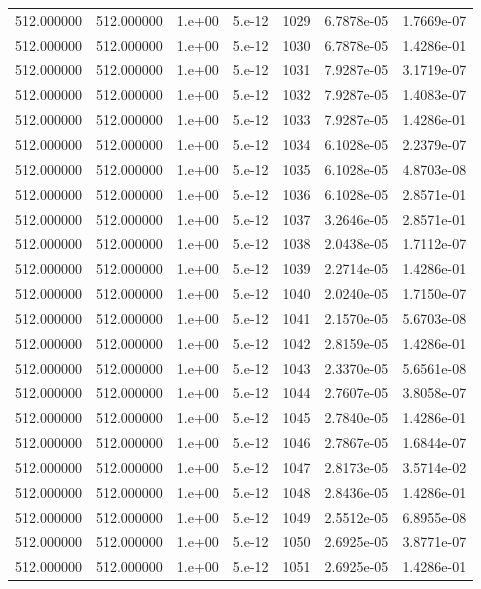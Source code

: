\begin{table}[htbp]
\begin{tabular}{rrrrrrr}
512.000000 & 512.000000 & 1.e+00 & 5.e-12 & 1029 & 6.7878e-05 & 1.7669e-07 \\
512.000000 & 512.000000 & 1.e+00 & 5.e-12 & 1030 & 6.7878e-05 & 1.4286e-01 \\
512.000000 & 512.000000 & 1.e+00 & 5.e-12 & 1031 & 7.9287e-05 & 3.1719e-07 \\
512.000000 & 512.000000 & 1.e+00 & 5.e-12 & 1032 & 7.9287e-05 & 1.4083e-07 \\
512.000000 & 512.000000 & 1.e+00 & 5.e-12 & 1033 & 7.9287e-05 & 1.4286e-01 \\
512.000000 & 512.000000 & 1.e+00 & 5.e-12 & 1034 & 6.1028e-05 & 2.2379e-07 \\
512.000000 & 512.000000 & 1.e+00 & 5.e-12 & 1035 & 6.1028e-05 & 4.8703e-08 \\
512.000000 & 512.000000 & 1.e+00 & 5.e-12 & 1036 & 6.1028e-05 & 2.8571e-01 \\
512.000000 & 512.000000 & 1.e+00 & 5.e-12 & 1037 & 3.2646e-05 & 2.8571e-01 \\
512.000000 & 512.000000 & 1.e+00 & 5.e-12 & 1038 & 2.0438e-05 & 1.7112e-07 \\
512.000000 & 512.000000 & 1.e+00 & 5.e-12 & 1039 & 2.2714e-05 & 1.4286e-01 \\
512.000000 & 512.000000 & 1.e+00 & 5.e-12 & 1040 & 2.0240e-05 & 1.7150e-07 \\
512.000000 & 512.000000 & 1.e+00 & 5.e-12 & 1041 & 2.1570e-05 & 5.6703e-08 \\
512.000000 & 512.000000 & 1.e+00 & 5.e-12 & 1042 & 2.8159e-05 & 1.4286e-01 \\
512.000000 & 512.000000 & 1.e+00 & 5.e-12 & 1043 & 2.3370e-05 & 5.6561e-08 \\
512.000000 & 512.000000 & 1.e+00 & 5.e-12 & 1044 & 2.7607e-05 & 3.8058e-07 \\
512.000000 & 512.000000 & 1.e+00 & 5.e-12 & 1045 & 2.7840e-05 & 1.4286e-01 \\
512.000000 & 512.000000 & 1.e+00 & 5.e-12 & 1046 & 2.7867e-05 & 1.6844e-07 \\
512.000000 & 512.000000 & 1.e+00 & 5.e-12 & 1047 & 2.8173e-05 & 3.5714e-02 \\
512.000000 & 512.000000 & 1.e+00 & 5.e-12 & 1048 & 2.8436e-05 & 1.4286e-01 \\
512.000000 & 512.000000 & 1.e+00 & 5.e-12 & 1049 & 2.5512e-05 & 6.8955e-08 \\
512.000000 & 512.000000 & 1.e+00 & 5.e-12 & 1050 & 2.6925e-05 & 3.8771e-07 \\
512.000000 & 512.000000 & 1.e+00 & 5.e-12 & 1051 & 2.6925e-05 & 1.4286e-01 \\

\end{tabular}
\end{table}

